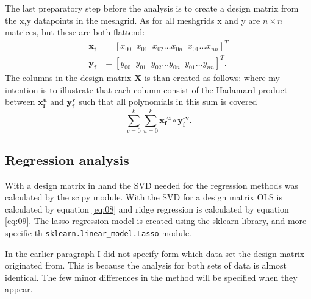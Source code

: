 \documentclass[uio,jmp,amsmath,amssymb,reprint,nofootinbib]{revtex4-1}
\numberwithin{equation}{section}
\newcommand{\lsb}{\left[}
\newcommand{\rsb}{\right]}
\begin{document}
The last preparatory step before the analysis is to create a design matrix from the x,y datapoints in the meshgrid. As for all meshgrids x and y are \(n\times n\) matrices, but these are both flattend:
\begin{align}
\bm{x_f} &= \lsb x_{00}\;\;x_{01}\;\;x_{02}\hdots x_{0n}\;\;x_{01}\hdots x_{nn}\rsb^T\\
\bm{y_f} &= \lsb y_{00}\;\;y_{01}\;\;y_{02}\hdots y_{0n}\;\;y_{01}\hdots y_{nn}\rsb^T.
\end{align}
The columns in the design matrix \(\bm{X}\) is than created as follows:
where my intention is to illustrate that each column consist of the Hadamard product between \(\bm{x_f^u}\) and \(\bm{y_f^v}\) such that all polynomials in this sum is covered
\begin{equation}
\sum_{v=0}^k\sum_{u=0}^k\bm{x_f^{\circ u}}\circ \bm{y_f^{\circ v}}.
\end{equation}




\subsection{Regression analysis}

With a design matrix in hand the SVD needed for the regression methods was calculated by the scipy module. With the SVD for a design matrix OLS is calculated by equation \ref{eq:08} and ridge regression is calculated by equation \ref{eq:09}. The lasso regression model is created using the sklearn library, and more specific th \texttt{sklearn.linear\_model.Lasso} module.

In the earlier paragraph I did not specify form which data set the design matrix originated from. This is because the analysis for both sets of data is almost identical. The few minor differences in the method will be specified when they appear.
\end{document}
